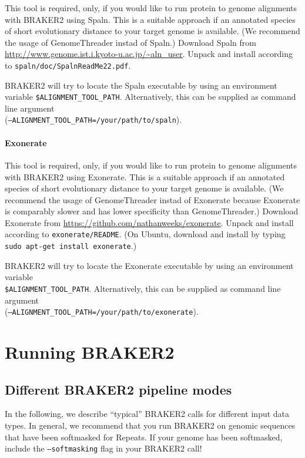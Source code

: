 \documentclass[]{article}
\let\oldparagraph\paragraph
\renewcommand{\paragraph}[1]{\oldparagraph{#1}\mbox{}}
\begin{document}
This tool is required, only, if you would like to run protein to genome
alignments with BRAKER2 using Spaln. This is a suitable approach if an
annotated species of short evolutionary distance to your target genome
is available. (We recommend the usage of GenomeThreader instad of
Spaln.) Download Spaln from
\url{http://www.genome.ist.i.kyoto-u.ac.jp/~aln_user}. Unpack and
install according to \texttt{spaln/doc/SpalnReadMe22.pdf}.

BRAKER2 will try to locate the Spaln executable by using an environment
variable \texttt{\$ALIGNMENT\_TOOL\_PATH}. Alternatively, this can be
supplied as command line argument\\
(\texttt{–ALIGNMENT\_TOOL\_PATH=/your/path/to/spaln}).

\paragraph{Exonerate}\label{exonerate}

This tool is required, only, if you would like to run protein to genome
alignments with BRAKER2 using Exonerate. This is a suitable approach if
an annotated species of short evolutionary distance to your target
genome is available. (We recommend the usage of GenomeThreader instad of
Exonerate because Exonerate is comparably slower and has lower
specificity than GenomeThreader.) Download Exonerate from
\url{https://github.com/nathanweeks/exonerate}. Unpack and install
according to \texttt{exonerate/README}. (On Ubuntu, download and install
by typing \texttt{sudo\ apt-get\ install\ exonerate}.)

BRAKER2 will try to locate the Exonerate executable by using an
environment variable\\
\texttt{\$ALIGNMENT\_TOOL\_PATH}. Alternatively, this can be supplied as
command line argument\\
(\texttt{–ALIGNMENT\_TOOL\_PATH=/your/path/to/exonerate}).

\section{Running BRAKER2}\label{running-braker2}

\subsection{Different BRAKER2 pipeline modes}\label{different-braker2-pipeline-modes}

In the following, we describe ``typical'' BRAKER2 calls for different
input data types. In general, we recommend that you run BRAKER2 on
genomic sequences that have been softmasked for Repeats. If your genome
has been softmasked, include the \texttt{–softmasking} flag in your
BRAKER2 call!
\end{document}

